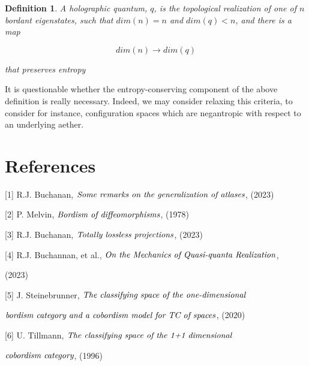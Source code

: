 \documentclass{article}
\newtheorem{dn}{Definition}
\begin{document}
	\begin{dn}
		A holographic quantum, $q$, is the topological realization of one of $n$ bordant eigenstates, such that $dim(n) = n$ and $dim(q) < n$, and there is a map
		
		$$dim(n) \longrightarrow dim(q)$$
		
		that preserves entropy
	\end{dn}
	
	It is questionable whether the entropy-conserving component of the above definition is really necessary. Indeed, we may consider relaxing this criteria, to consider for instance, configuration spaces which are negantropic with respect to an underlying aether.
	
		\section{References}
	
	\text{ }
	
	[1] R.J. Buchanan, $\emph{Some remarks on the generalization of atlases}$, (2023)
	
	[2] P. Melvin, $\emph{Bordism of diffeomorphisms}$, (1978)
	
	[3] R.J. Buchanan, $\emph{Totally lossless projections}$, (2023)
	
	[4] R.J. Buchannan, et al., $\emph{On the Mechanics of Quasi-quanta Realization}$,
	
	 (2023)
	 
	 [5] J. Steinebrunner, $\emph{The classifying space of the one-dimensional }$
	 	
	 	
	 	$\emph{bordism category and a cobordism model for TC of spaces}$, (2020)
	 	
	 [6] U. Tillmann, $\emph{The classifying space of the 1+1 dimensional}$
	 
	 $\emph{cobordism category}$, (1996)
\end{document}
